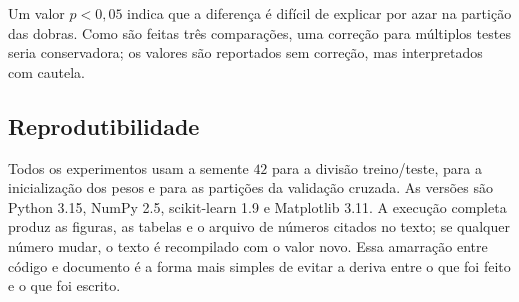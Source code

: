 Um valor $p < 0{,}05$ indica que a diferença é difícil de explicar por azar na partição das
dobras. Como são feitas três comparações, uma correção para múltiplos testes seria conservadora;
os valores são reportados sem correção, mas interpretados com cautela.

\subsection{Reprodutibilidade}

Todos os experimentos usam a semente $42$ para a divisão treino/teste, para a inicialização dos
pesos e para as partições da validação cruzada. As versões são Python 3.15, NumPy 2.5,
scikit-learn 1.9 e Matplotlib 3.11. A execução completa produz as figuras, as tabelas e o arquivo
de números citados no texto; se qualquer número mudar, o texto é recompilado com o valor novo.
Essa amarração entre código e documento é a forma mais simples de evitar a deriva entre o que foi
feito e o que foi escrito.
